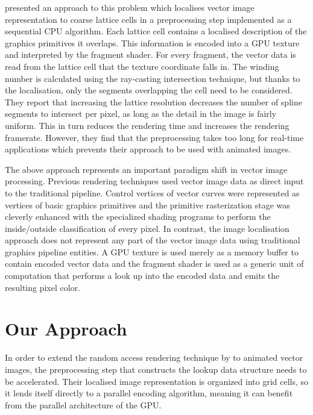 \documentclass[11pt,a4paper,twoside]{article}
\begin{document}
\cite{NehabHoppe08} presented an approach to this problem which localises vector image representation to coarse lattice cells in a preprocessing step implemented as a sequential CPU algorithm. Each lattice cell contains a localised description of the graphics primitives it overlaps. This information is encoded into a GPU texture and interpreted by the fragment shader. For every fragment, the vector data is read from the lattice cell that the texture coordinate falls in. The winding number is calculated using the ray-casting intersection technique, but thanks to the localisation, only the segments overlapping the cell need to be considered. They report that increasing the lattice resolution decreases the number of spline segments to intersect per pixel, as long as the detail in the image is fairly uniform. This in turn reduces the rendering time and increases the rendering framerate. However, they find that the preprocessing takes too long for real-time applications which prevents their approach to be used with animated images.

The above approach represents an important paradigm shift in vector image processing. Previous rendering techniques used vector image data as direct input to the traditional pipeline. Control vertices of vector curves were represented as vertices of basic graphics primitives and the primitive rasterization stage was cleverly enhanced with the specialized shading programs to perform the inside/outside classification of every pixel. In contrast, the image localisation approach does not represent any part of the vector image data using traditional graphics pipeline entities. A GPU texture is used merely as a memory buffer to contain encoded vector data and the fragment shader is used as a generic unit of computation that performs a look up into the encoded data and emits the resulting pixel color.

\section {Our Approach}
\label{sec:our}

In order to extend the random access rendering technique by \cite{NehabHoppe08} to animated vector images, the preprocessing step that constructs the lookup data structure needs to be accelerated. Their localised image representation is organized into grid cells, so it lends itself directly to a parallel encoding algorithm, meaning it can benefit from the parallel architecture of the GPU.
\end{document}
